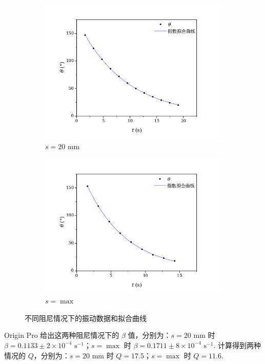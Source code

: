 \documentclass{THUexprep}
\begin{document}
\begin{figure}[h]
    \begin{subfigure}[b]{0.45\textwidth}
        \includegraphics[scale=0.4]{exp2.png}
        \caption{$s=20\text{ mm}$}
        \label{fig:side:a}
    \end{subfigure}
    \begin{subfigure}[b]{0.45\textwidth}
        \includegraphics[scale=0.4]{exp3.png}
        \caption{$s=\max$}
        \label{fig:side:b}
    \end{subfigure}
    \caption{不同阻尼情况下的振动数据和拟合曲线}
\end{figure}

Origin Pro 给出这两种阻尼情况下的 $\beta$ 值，分别为：$s=20\text{ mm}$ 时 $\beta=0.1133\pm2\times10^{-4}\text{ s}^{-1}$；$s=\max$ 时 $\beta=0.1711\pm8\times10^{-4}\text{ s}^{-1}$. 计算得到两种情况的 $Q$，分别为：$s=20\text{ mm}$ 时 $Q=17.5$；$s=\max$ 时 $Q=11.6$.
\end{document}
